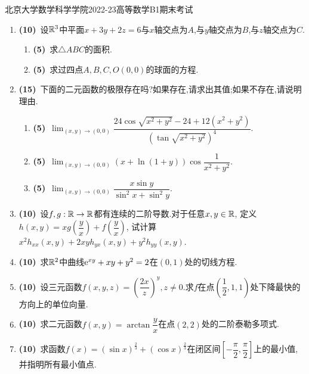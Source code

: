 \documentclass{ctexart}
\begin{document}
\pagestyle{empty}

\begin{center}\Large
    北京大学数学科学学院2022-23高等数学B1期末考试
\end{center}
\begin{enumerate}[leftmargin=*,label=\textbf{\arabic*.}]
    \item \textbf{(10)}\ 设$\mathbb{R}^3$中平面$x+3y+2z=6$与$x$轴交点为$A$,与$y$轴交点为$B$,与$z$轴交点为$C$.
        \begin{enumerate}[label=\textbf{(\arabic*)},leftmargin=*]
            \item \textbf{(5)}\ 求$\triangle ABC$的面积.
            \item \textbf{(5)}\ 求过四点$A,B,C,O(0,0)$的球面的方程.
        \end{enumerate}
    \item \textbf{(15)}\ 下面的二元函数的极限存在吗?如果存在,请求出其值;如果不存在,请说明理由.
        \begin{enumerate}[label=\textbf{(\arabic*)},leftmargin=*]
            \item \textbf{(5)}\ $\displaystyle\lim_{(x,y)\to(0,0)}\dfrac{24\cos\sqrt{x^2+y^2}-24+12\left(x^2+y^2\right)}{\left(\tan\sqrt{x^2+y^2}\right)^4}$.
            \item \textbf{(5)}\ $\displaystyle\lim_{(x,y)\to(0,0)}\left(x+\ln(1+y)\right)\cos\dfrac{1}{x^2+y^2}$.
            \item \textbf{(5)}\ $\displaystyle\lim_{(x,y)\to(0,0)}\dfrac{x\sin y}{\sin^2x+\sin^2y}$.
        \end{enumerate}
    \item \textbf{(10)}\ 设$f,g:\mathbb{R}\to\mathbb{R}$都有连续的二阶导数.对于任意$x,y\in\mathbb{R}$,
        定义$h(x,y)=xg\left(\dfrac{y}{x}\right)+f\left(\dfrac{y}{x}\right)$,
        试计算$x^2h_{xx}(x,y)+2xyh_{yx}(x,y)+y^2h_{yy}(x,y)$.
    \item \textbf{(10)}\ 求$\mathbb{R}^2$中曲线$\mathrm{e}^{xy}+xy+y^2=2$在$(0,1)$处的切线方程.
    \item \textbf{(10)}\ 设三元函数$f(x,y,z)=\left(\dfrac{2x}{z}\right)^{y},z\neq0$.求$f$在点$\left(\dfrac{1}{2},1,1\right)$处下降最快的方向上的单位向量.
    \item \textbf{(10)}\ 求二元函数$f(x,y)=\arctan\dfrac{y}{x}$在点$(2,2)$处的二阶泰勒多项式.
    \item \textbf{(10)}\ 求函数$f(x)=\left(\sin x\right)^{\frac{2}{3}}+\left(\cos x\right)^{\frac{2}{3}}$在闭区间$\left[-\dfrac{\pi}{2},\dfrac{\pi}{2}\right]$上的最小值,并指明所有最小值点.

\end{enumerate}
\end{document}
